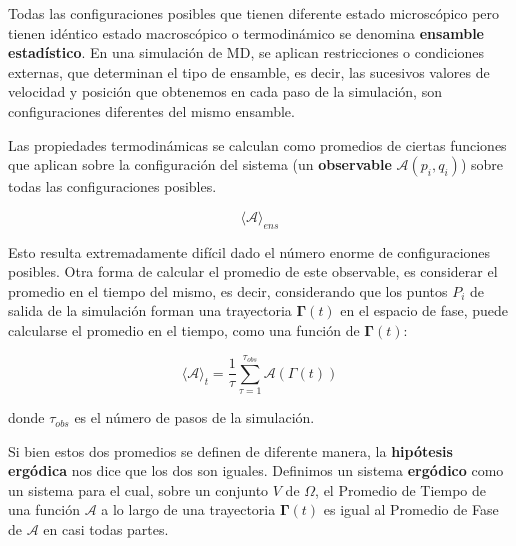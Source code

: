 Todas las configuraciones posibles que tienen diferente estado microscópico pero tienen idéntico estado macroscópico o termodinámico se denomina \textbf{ensamble estadístico}. En una simulación de MD, se aplican restricciones o condiciones externas, que determinan el tipo de ensamble, es decir, las sucesivos valores de velocidad y posición que obtenemos en cada paso de la simulación, son configuraciones diferentes del mismo ensamble.

Las propiedades termodinámicas se calculan como promedios de ciertas funciones que aplican sobre la configuración del sistema (un \textbf{observable} $\mathbf{\mathcal{A}}(p_{i},q_{i})$) sobre todas las configuraciones posibles.

\begin{equation}
\langle \mathbf{\mathcal{A}} \rangle _{ens}
\end{equation}

Esto resulta extremadamente difícil dado el número enorme de configuraciones posibles. Otra forma de calcular el promedio de este observable, es considerar el promedio en el tiempo del mismo, es decir, considerando que los puntos $P_{i}$ de salida de la simulación forman una trayectoria $\mathbf{\Gamma}(t)$ en el espacio de fase, puede calcularse el promedio en el tiempo, como una función de $\mathbf{\Gamma}(t)$:

\begin{equation}
\langle \mathbf{\mathcal{A}} \rangle _{t} = \frac{1}{\tau} \sum_{\tau = 1}^{\tau_{obs}} \mathbf{\mathcal{A}}(\Gamma (t))
\end{equation}

donde $\tau_{obs}$ es el número de pasos de la simulación.

Si bien estos dos promedios se definen de diferente manera, la \textbf{hipótesis ergódica} nos dice que los dos son iguales. Definimos un sistema \textbf{ergódico} como un sistema para el cual, sobre un conjunto $V$ de $\Omega$, el Promedio de Tiempo\footnotemark{} de una función $\mathbf{\mathcal{A}}$ a lo largo de una trayectoria $\mathbf{\Gamma}(t)$ es igual al Promedio de Fase\footnotemark{} de $\mathbf{\mathcal{A}}$ en casi todas partes\footnotemark.


